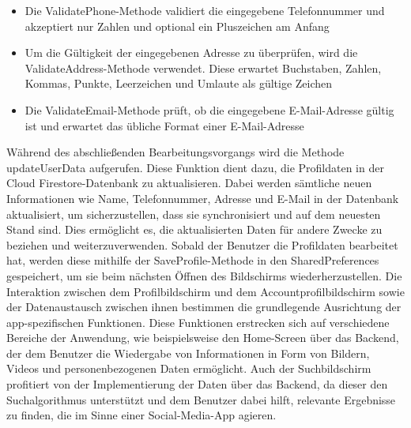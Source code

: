 \begin{itemize}[itemsep=0pt]
    \item{Die ValidatePhone-Methode validiert die eingegebene Telefonnummer und akzeptiert nur Zahlen und optional ein Pluszeichen am Anfang}
\end{itemize}
\begin{itemize}[itemsep=0pt]
    \item{Um die Gültigkeit der eingegebenen Adresse zu überprüfen, wird die ValidateAddress-Methode verwendet. Diese erwartet Buchstaben, Zahlen, Kommas, Punkte, Leerzeichen und Umlaute als gültige Zeichen} 
\end{itemize}
\begin{itemize}[itemsep=0pt]
	\item{Die ValidateEmail-Methode prüft, ob die eingegebene E-Mail-Adresse gültig ist und erwartet das übliche Format einer E-Mail-Adresse}
\end{itemize}
Während des abschließenden Bearbeitungsvorgangs wird die Methode updateUserData aufgerufen. Diese Funktion dient dazu, die Profildaten in der Cloud Firestore-Datenbank zu aktualisieren. Dabei werden sämtliche neuen Informationen wie Name, Telefonnummer, Adresse und E-Mail in der Datenbank aktualisiert, um sicherzustellen, dass sie synchronisiert und auf dem neuesten Stand sind. Dies ermöglicht es, die aktualisierten Daten für andere Zwecke zu beziehen und weiterzuverwenden. Sobald der Benutzer die Profildaten bearbeitet hat, werden diese mithilfe der SaveProfile-Methode in den SharedPreferences gespeichert, um sie beim nächsten Öffnen des Bildschirms wiederherzustellen.  Die Interaktion zwischen dem Profilbildschirm und dem Accountprofilbildschirm sowie der Datenaustausch zwischen ihnen bestimmen die grundlegende Ausrichtung der app-spezifischen Funktionen. Diese Funktionen erstrecken sich auf verschiedene Bereiche der Anwendung, wie beispielsweise den Home-Screen über das Backend, der dem Benutzer die Wiedergabe von Informationen in Form von Bildern, Videos und personenbezogenen Daten ermöglicht. Auch der Suchbildschirm profitiert von der Implementierung der Daten über das Backend, da dieser den Suchalgorithmus unterstützt und dem Benutzer dabei hilft, relevante Ergebnisse zu finden, die im Sinne einer Social-Media-App agieren.


